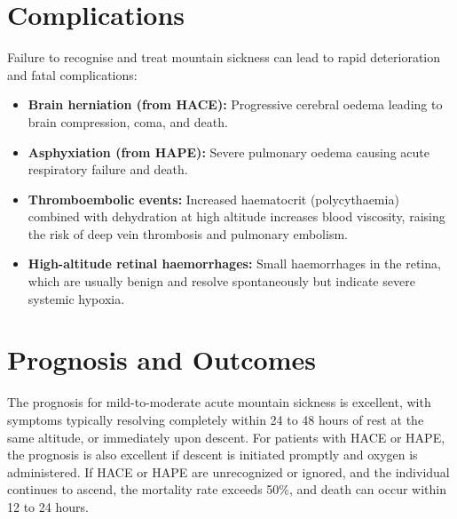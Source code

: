 \section*{Complications}
Failure to recognise and treat mountain sickness can lead to rapid deterioration and fatal complications:
\begin{itemize}
    \item \textbf{Brain herniation (from HACE):} Progressive cerebral oedema leading to brain compression, coma, and death.
    \item \textbf{Asphyxiation (from HAPE):} Severe pulmonary oedema causing acute respiratory failure and death.
    \item \textbf{Thromboembolic events:} Increased haematocrit (polycythaemia) combined with dehydration at high altitude increases blood viscosity, raising the risk of deep vein thrombosis and pulmonary embolism.
    \item \textbf{High-altitude retinal haemorrhages:} Small haemorrhages in the retina, which are usually benign and resolve spontaneously but indicate severe systemic hypoxia.
\end{itemize}

\section*{Prognosis and Outcomes}
The prognosis for mild-to-moderate acute mountain sickness is excellent, with symptoms typically resolving completely within 24 to 48 hours of rest at the same altitude, or immediately upon descent. For patients with HACE or HAPE, the prognosis is also excellent if descent is initiated promptly and oxygen is administered. If HACE or HAPE are unrecognized or ignored, and the individual continues to ascend, the mortality rate exceeds 50\%, and death can occur within 12 to 24 hours.

